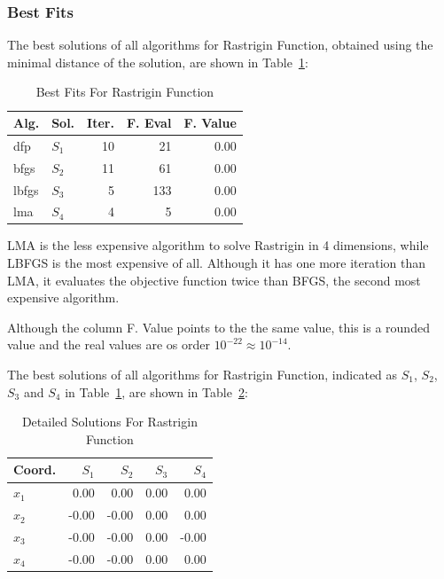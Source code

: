 \documentclass[conference]{IEEEtran}
\begin{document}
\subsubsection{Best Fits}
\label{bestfitsrastrigin4d4D}


The best solutions of all algorithms for Rastrigin Function, obtained using the minimal
distance of the solution, are shown in Table~\ref{solutions:rastrigin4d}:

\begin{table}[H]
\centering
\caption{Best Fits For Rastrigin Function}
\label{solutions:rastrigin4d}
\begin{tabular}{llrrr}
\toprule
 Alg. &    Sol. &  Iter. &  F. Eval &  F. Value \\
\midrule
  dfp & $S_{1}$ &     10 &       21 &      0.00 \\
 bfgs & $S_{2}$ &     11 &       61 &      0.00 \\
lbfgs & $S_{3}$ &      5 &      133 &      0.00 \\
  lma & $S_{4}$ &      4 &        5 &      0.00 \\
\bottomrule
\end{tabular}
\end{table}

LMA is the less expensive algorithm to solve Rastrigin in 4 dimensions, while LBFGS
is the most expensive of all. Although it has one more iteration than LMA, it evaluates
the objective function twice than BFGS, the second most expensive algorithm.

Although the column F. Value points to the the same value, this is a rounded value
and the real values are os order $10^{-22} \approx 10^{-14}$.


The best solutions of all algorithms for Rastrigin Function, indicated as
$S_{1}$, $S_{2}$, $S_{3}$ and $S_{4}$ in Table~\ref{solutions:rastrigin4d}, are shown
in Table~\ref{detailedsolutions:rastrigin4d}:

\begin{table}[H]
\centering
\caption{Detailed Solutions For Rastrigin Function}
\label{detailedsolutions:rastrigin4d}
\begin{tabular}{lrrrr}
\toprule
 Coord. &  $S_{1}$ &  $S_{2}$ &  $S_{3}$ &  $S_{4}$ \\
\midrule
$x_{1}$ &     0.00 &     0.00 &     0.00 &     0.00 \\
$x_{2}$ &    -0.00 &    -0.00 &     0.00 &     0.00 \\
$x_{3}$ &    -0.00 &    -0.00 &     0.00 &    -0.00 \\
$x_{4}$ &    -0.00 &    -0.00 &     0.00 &     0.00 \\
\bottomrule
\end{tabular}
\end{table}
\end{document}
